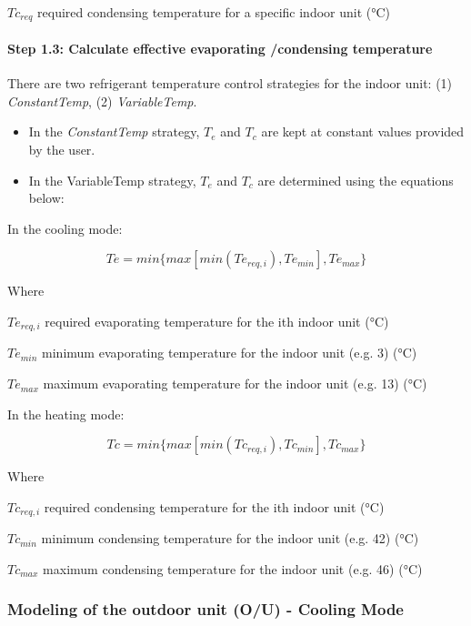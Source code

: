 $Tc_{req}$ required condensing temperature for a specific indoor unit (°C)

\paragraph{Step 1.3: Calculate effective evaporating /condensing temperature}\label{step-1.3-calculate-effective-evaporating-condensing-temperature}

There are two refrigerant temperature control strategies for the indoor unit: (1) \emph{ConstantTemp}, (2) \emph{VariableTemp}.

\begin{itemize}
  \item
    In the \emph{ConstantTemp} strategy, $T_e$ and $T_c$ are kept at constant values provided by the user.

 \item
   In the {VariableTemp} strategy, $T_e$ and $T_c$ are determined using the equations below:
\end{itemize}

In the cooling mode:

\begin{equation}
  Te = min \{ max [ min(Te_{req,i}), Te_{min}], Te_{max}\}
\end{equation}
 
Where

$Te_{req,i}$ required evaporating temperature for the ith indoor unit (°C)

$Te_{min}$ minimum evaporating temperature for the indoor unit (e.g. 3) (°C)

$Te_{max}$ maximum evaporating temperature for the indoor unit (e.g. 13) (°C)

In the heating mode:

\begin{equation}
  Tc = min \{ max[min(Tc_{req,i}),Tc_{min}],Tc_{max} \}
\end{equation}
 
Where

$Tc_{req,i}$ required condensing temperature for the ith indoor unit (°C)

$Tc_{min}$ minimum condensing temperature for the indoor unit (e.g. 42) (°C)

$Tc_{max}$ maximum condensing temperature for the indoor unit (e.g. 46) (°C)

\subsubsection{Modeling of the outdoor unit (O/U) - Cooling Mode}\label{modeling-of-the-outdoor-unit-ou-cooling-mode}

